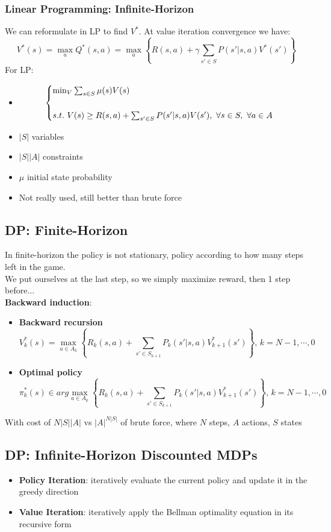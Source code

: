 \subsubsection{Linear Programming: Infinite-Horizon}
    We can reformulate in LP to find $V^*$. At value iteration convergence we have:
    $$V^*(s)=\max_aQ^*(s,a)=\max_a\left\{R(s,a)+\gamma\sum_{s' \in S}P(s'|s,a)V^*(s')\right\}$$
    For LP:
    \begin{itemize}
        \item
        $$
        \begin{cases}
            \min_V\sum_{s \in S}\mu(s)V(s)\\
            \vspace{0.1em}\\
            s.t.\,\,V(s)\geq R(s,a)+\sum_{s'\in S}P(s'|s,a)V(s'),\,\,\forall s \in S,\,\,\forall a \in A
        \end{cases}
        $$
        \item $|S|$ variables
        \item $|S||A|$ constraints
        \item $\mu$ initial state probability
        \item Not really used, still better than brute force
    \end{itemize}
\subsection{DP: Finite-Horizon}
    In finite-horizon the policy is not stationary, policy according to how many steps left in the game.\\
    We put ourselves at the last step, so we simply maximize reward, then 1 step before...\\\textbf{Backward induction}:
    \begin{itemize}
        \item \textbf{Backward recursion}
        $$V^*_k(s)=\max_{a\in A_k}\left\{R_k(s,a)+\sum_{s'\in S_{k+1}}P_k(s'|s,a)V^*_{k+1}(s')\right\},\,k=N-1,\cdots,0$$
        \item  \textbf{Optimal policy}
        $$\pi^*_k(s)\in arg\max_{a\in A_k}\left\{R_k(s,a)+\sum_{s'\in S_{k+1}}P_k(s'|s,a)V^*_{k+1}(s')\right\},\,k=N-1,\cdots,0$$
    \end{itemize}
    With cost of $N|S||A|$ vs $|A|^{N|S|}$ of brute force, where $N$ steps, $A$ actions, $S$ states

\subsection{DP: Infinite-Horizon Discounted MDPs}
    \begin{itemize}
        \item \textbf{Policy Iteration}: iteratively evaluate the current policy and update it in the greedy direction
        \item \textbf{Value Iteration}: iteratively apply the Bellman optimality equation in its recursive form
    \end{itemize}
